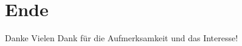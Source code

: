 \section*{Ende~}
\begin{frame}[noframenumbering]{Danke}
\centering
Vielen Dank für die Aufmerksamkeit und das Interesse!
\end{frame}